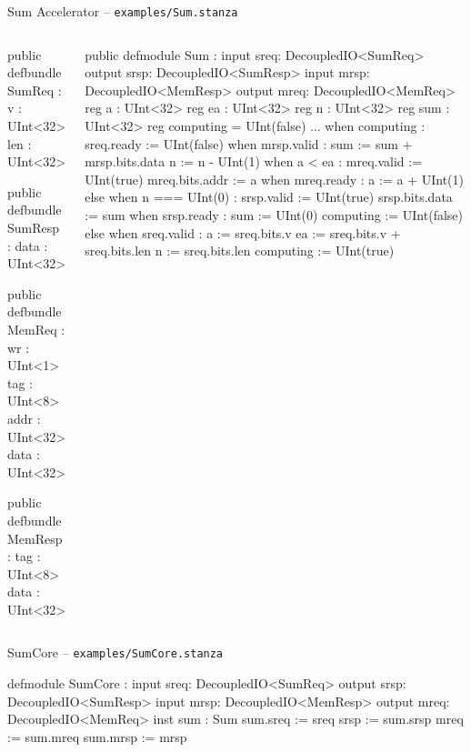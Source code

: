 \documentclass[xcolor=pdflatex,dvipsnames,table]{beamer}
\begin{document}
\begin{frame}[fragile]{Sum Accelerator -- {\tt examples/Sum.stanza}}

\begin{columns}
{
\begin{stanza}
public defbundle SumReq  :
  v   : UInt<32>
  len : UInt<32>

public defbundle SumResp  :
  data : UInt<32>

public defbundle MemReq :
  wr   : UInt<1>
  tag  : UInt<8>
  addr : UInt<32>
  data : UInt<32>

public defbundle MemResp :
  tag  : UInt<8>
  data : UInt<32>
\end{stanza}
}


{
\begin{stanza}
public defmodule Sum :
  input  sreq: DecoupledIO<SumReq>
  output srsp: DecoupledIO<SumResp>
  input  mrsp: DecoupledIO<MemResp>
  output mreq: DecoupledIO<MemReq>
  reg a   : UInt<32>
  reg ea  : UInt<32>
  reg n   : UInt<32>
  reg sum : UInt<32>
  reg computing  = UInt(false)
  ...
  when computing :
    sreq.ready := UInt(false)
    when mrsp.valid :
      sum := sum + mrsp.bits.data
      n   := n - UInt(1)
    when a < ea :
      mreq.valid := UInt(true)
      mreq.bits.addr := a
      when mreq.ready :
        a := a + UInt(1)
    else when n === UInt(0) :
      srsp.valid := UInt(true)
      srsp.bits.data := sum
      when srsp.ready :
        sum       := UInt(0)
        computing := UInt(false)
  else when sreq.valid :
    a  := sreq.bits.v
    ea := sreq.bits.v + sreq.bits.len
    n  := sreq.bits.len
    computing := UInt(true)
\end{stanza}
}
\end{columns}

\end{frame}

\begin{frame}[fragile]{SumCore -- {\tt examples/SumCore.stanza}}

{
\begin{stanza}
defmodule SumCore :
  input  sreq: DecoupledIO<SumReq>
  output srsp: DecoupledIO<SumResp>
  input  mrsp: DecoupledIO<MemResp>
  output mreq: DecoupledIO<MemReq>
  inst sum : Sum
  sum.sreq := sreq
  srsp     := sum.srsp
  mreq     := sum.mreq
  sum.mrsp := mrsp
\end{stanza}
}

\end{frame}
\end{document}
